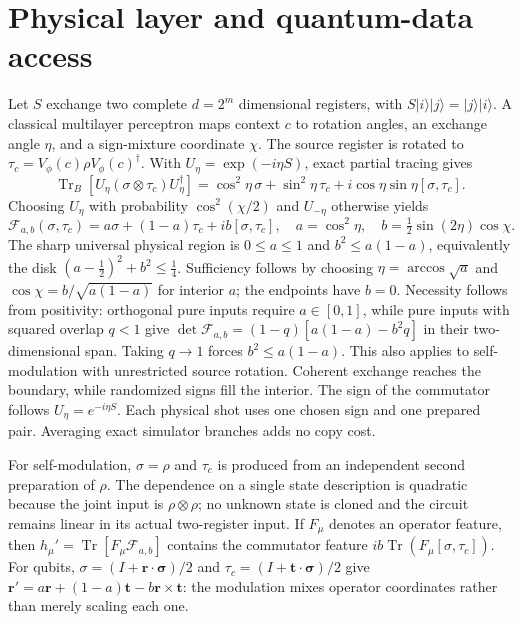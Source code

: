 \documentclass[pdflatex,sn-mathphys-num]{sn-jnl}
\newcommand{\Tr}{\operatorname{Tr}}
\begin{document}
\section{Physical layer and quantum-data access}
Let $S$ exchange two complete $d=2^m$ dimensional registers, with $S|i\rangle|j\rangle=|j\rangle|i\rangle$. A classical multilayer perceptron maps context $c$ to rotation angles, an exchange angle $\eta$, and a sign-mixture coordinate $\chi$. The source register is rotated to $\tau_c=V_\phi(c)\rho V_\phi(c)^\dagger$. With $U_\eta=\exp(-i\eta S)$, exact partial tracing gives
\begin{equation}
 \Tr_B[U_\eta(\sigma\otimes\tau_c)U_\eta^\dagger]
 =\cos^2\eta\,\sigma+\sin^2\eta\,\tau_c
 +i\cos\eta\sin\eta[\sigma,\tau_c].\label{eq:swap}
\end{equation}
Choosing $U_\eta$ with probability $\cos^2(\chi/2)$ and $U_{-\eta}$ otherwise yields
\begin{equation}
 \mathcal F_{a,b}(\sigma,\tau_c)=a\sigma+(1-a)\tau_c+ib[\sigma,\tau_c],\quad
 a=\cos^2\eta,\quad b=\tfrac12\sin(2\eta)\cos\chi.
 \label{eq:map}
\end{equation}
The sharp universal physical region is $0\leq a\leq1$ and $b^2\leq a(1-a)$, equivalently the disk $(a-\frac12)^2+b^2\leq\frac14$. Sufficiency follows by choosing $\eta=\arccos\sqrt a$ and $\cos\chi=b/\sqrt{a(1-a)}$ for interior $a$; the endpoints have $b=0$. Necessity follows from positivity: orthogonal pure inputs require $a\in[0,1]$, while pure inputs with squared overlap $q<1$ give $\det\mathcal F_{a,b}=(1-q)[a(1-a)-b^2q]$ in their two-dimensional span. Taking $q\to1$ forces $b^2\leq a(1-a)$. This also applies to self-modulation with unrestricted source rotation. Coherent exchange reaches the boundary, while randomized signs fill the interior. The sign of the commutator follows $U_\eta=e^{-i\eta S}$. Each physical shot uses one chosen sign and one prepared pair. Averaging exact simulator branches adds no copy cost.

For self-modulation, $\sigma=\rho$ and $\tau_c$ is produced from an independent second preparation of $\rho$. The dependence on a single state description is quadratic because the joint input is $\rho\otimes\rho$; no unknown state is cloned and the circuit remains linear in its actual two-register input. If $F_\mu$ denotes an operator feature, then $h_\mu'=\Tr[F_\mu\mathcal F_{a,b}]$ contains the commutator feature $ib\Tr(F_\mu[\sigma,\tau_c])$. For qubits, $\sigma=(I+\mathbf r\cdot\boldsymbol\sigma)/2$ and $\tau_c=(I+\mathbf t\cdot\boldsymbol\sigma)/2$ give $\mathbf r'=a\mathbf r+(1-a)\mathbf t-b\mathbf r\times\mathbf t$: the modulation mixes operator coordinates rather than merely scaling each one.
\end{document}
